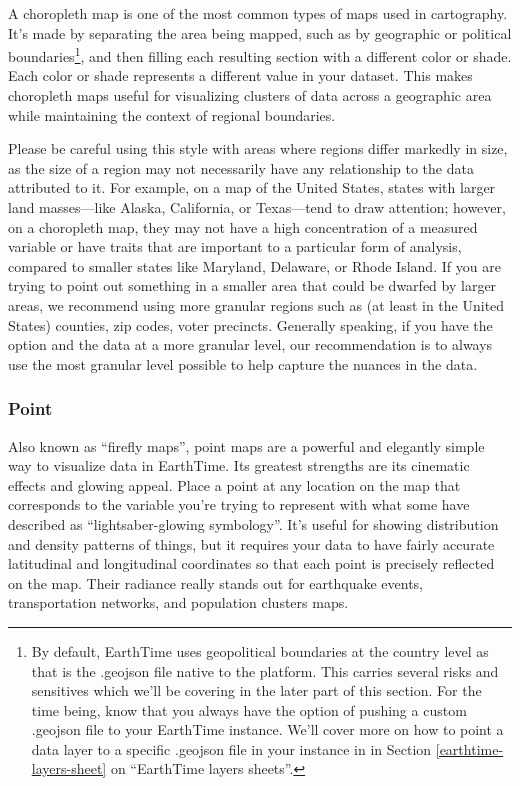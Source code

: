 \documentclass[
]{book}
\begin{document}
A choropleth map is one of the most common types of maps used in cartography. It's made by separating the area being mapped, such as by geographic or political boundaries\footnote{ By default, EarthTime uses geopolitical boundaries at the country level as that is the .geojson file native to the platform. This carries several risks and sensitives which we'll be covering in the later part of this section. For the time being, know that you always have the option of pushing a custom .geojson file to your EarthTime instance. We'll cover more on how to point a data layer to a specific .geojson file in your instance in in Section \ref{earthtime-layers-sheet} on ``EarthTime layers sheets''.}, and then filling each resulting section with a different color or shade. Each color or shade represents a different value in your dataset. This makes choropleth maps useful for visualizing clusters of data across a geographic area while maintaining the context of regional boundaries.

Please be careful using this style with areas where regions differ markedly in size, as the size of a region may not necessarily have any relationship to the data attributed to it. For example, on a map of the United States, states with larger land masses---like Alaska, California, or Texas---tend to draw attention; however, on a choropleth map, they may not have a high concentration of a measured variable or have traits that are important to a particular form of analysis, compared to smaller states like Maryland, Delaware, or Rhode Island. If you are trying to point out something in a smaller area that could be dwarfed by larger areas, we recommend using more granular regions such as (at least in the United States) counties, zip codes, voter precincts. Generally speaking, if you have the option and the data at a more granular level, our recommendation is to always use the most granular level possible to help capture the nuances in the data.

\hypertarget{point}{%
\subsubsection*{Point}\label{point}}


Also known as ``firefly maps'', point maps are a powerful and elegantly simple way to visualize data in EarthTime. Its greatest strengths are its cinematic effects and glowing appeal. Place a point at any location on the map that corresponds to the variable you're trying to represent with what some have described as ``lightsaber-glowing symbology''. It's useful for showing distribution and density patterns of things, but it requires your data to have fairly accurate latitudinal and longitudinal coordinates so that each point is precisely reflected on the map. Their radiance really stands out for earthquake events, transportation networks, and population clusters maps.
\end{document}
